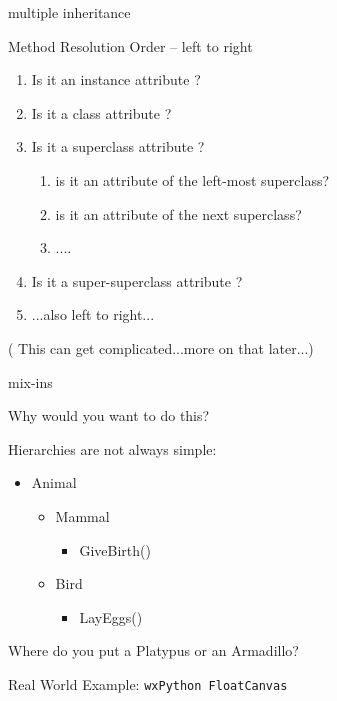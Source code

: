 \documentclass{beamer}
\begin{document}
\begin{frame}[fragile]{multiple inheritance}

\vfill
{\Large Method Resolution Order -- left to right}

\begin{enumerate}
  \item Is it an instance attribute ?
  \item Is it a class attribute ?
  \item Is it a superclass attribute ?
  \begin{enumerate}
     \item is it an attribute of the left-most superclass?
     \item is it an attribute of the next superclass?
     \item ....
  \end{enumerate}
  \item Is it a super-superclass attribute ?
  \item ...also left to right...
\end{enumerate}

\vfill
{\large ( This can get complicated...more on that later...)}

\end{frame} 

\begin{frame}[fragile]{mix-ins}

{\Large Why would you want to do this?}

\vfill
{\Large Hierarchies are not always simple:}
\vfill
\begin{itemize}
  \item Animal
  \begin{itemize}
    \item Mammal
    \begin{itemize}
      \item GiveBirth()
    \end{itemize}
    \item Bird
    \begin{itemize}
      \item LayEggs()
    \end{itemize}
  \end{itemize}
\end{itemize}
\vfill
{\Large Where do you put a Platypus or an Armadillo?}

\vfill
{\Large Real World Example: \verb|wxPython FloatCanvas|}
\end{frame} 
\end{document}
